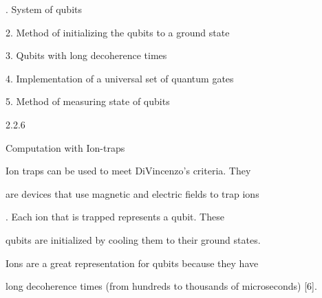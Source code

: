 \documentclass[a4paper,portrait,12pt]{article}
\begin{document}
\begin{flushleft}
. System of qubits
\end{flushleft}


\begin{flushleft}
2. Method of initializing the qubits to a ground state
\end{flushleft}


\begin{flushleft}
3. Qubits with long decoherence times
\end{flushleft}


\begin{flushleft}
4. Implementation of a universal set of quantum gates
\end{flushleft}


\begin{flushleft}
5. Method of measuring state of qubits
\end{flushleft}





2.2.6





\begin{flushleft}
Computation with Ion-traps
\end{flushleft}





\begin{flushleft}
Ion traps can be used to meet DiVincenzo's criteria. They
\end{flushleft}


\begin{flushleft}
are devices that use magnetic and electric fields to trap ions
\end{flushleft}


\begin{flushleft}
[8]. Each ion that is trapped represents a qubit. These
\end{flushleft}


\begin{flushleft}
qubits are initialized by cooling them to their ground states.
\end{flushleft}


\begin{flushleft}
Ions are a great representation for qubits because they have
\end{flushleft}


\begin{flushleft}
long decoherence times (from hundreds to thousands of microseconds) [6].
\end{flushleft}
\end{document}
